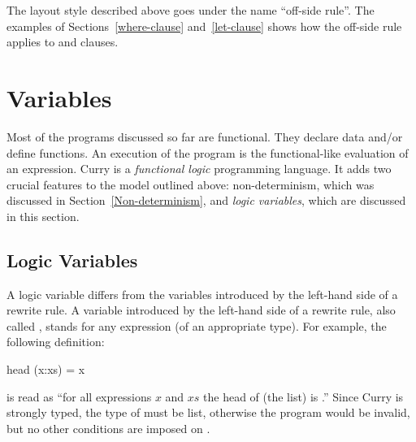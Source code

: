 The layout style described above goes under the name
``off-side rule''.
The examples of Sections~\ref{where-clause} and~\ref{let-clause}
shows how the off-side rule applies to  and
 clauses.

\section{Variables}

Most of the programs discussed so far are functional.
They declare data and/or define functions.
An execution of the program is the functional-like
evaluation of an expression.
Curry is a \emph{functional logic}
programming language.
It adds two crucial features to the model outlined above:
non-determinism, which was discussed in Section~\ref{Non-determinism},
and \emph{logic variables},
which are discussed in this section.

\subsection{Logic Variables}
\label{Logic variables}

A logic variable differs from the variables introduced by the left-hand
side of a rewrite rule.
A variable introduced by the left-hand side of a rewrite rule,
also called ,
stands for any expression (of an appropriate type).
For example, the following definition:
%
\begin{curry}
head (x:xs) = x
\end{curry}
%
is read as ``for all expressions $x$ and $xs$ the head of (the list)
 is .''
Since Curry is strongly typed, the type of  must be list,
otherwise the program would be invalid,
but no other conditions are imposed on . 

